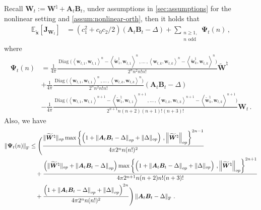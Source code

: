 \begin{lemma}
\label{expec-grad}
    Recall $\bm W_t := \bm W^\natural + \bm A_t \bm B_t$, under assumptions in \cref{sec:assumptions} for the nonlinear setting and \cref{assum:nonlinear-orth}, then it holds that
    \begin{align*}
    \mathbb{E}_{\widetilde{\bm x}}\left[\bm J_{\bm W_t}\right] & = \left(c_1^2+c_0 c_2 / 2\right)\left(\bm A_t \bm B_t - \Delta\right)+\sum_{\substack{n\geq 1,\\n\text{ odd}}}\bm \Psi_t(n)\,,
\end{align*}
where
\begin{align*}
    \bm \Psi_t(n) & = \frac{1}{4\pi} \frac{\operatorname{Diag}\bigg(\left\langle{\bm w}_{t,1},{\bm w}_{t,1}\right\rangle^{n}-\left\langle\widetilde{\bm w}^\natural_1,{\bm w}_{t,1}\right\rangle^{n}\,,...\,,\left\langle{\bm w}_{t,k},{\bm w}_{t,k}\right\rangle^{n}-\left\langle\widetilde{\bm w}^\natural_k,{\bm w}_{t,k}\right\rangle^{n}\bigg)}{2^{n} n^2 n! n!}  \widetilde{\bm W}^\natural\\
    &+\frac{1}{4\pi} \frac{\operatorname{Diag}\bigg(\left\langle{\bm w}_{t,1},{\bm w}_{t,1}\right\rangle^n\,,...\,,\left\langle{\bm w}_{t,k},{\bm w}_{t,k}\right\rangle^n\bigg)}{2^{n} n^2 n! n!}\left(\bm A_t \bm B_t - \Delta\right)\\
    &-\frac{1}{4\pi}\frac{\operatorname{Diag}\bigg(\left\langle{\bm w}_{t,1},{\bm w}_{t,1}\right\rangle^{n+1}-\left\langle\widetilde{\bm w}^\natural_1,{\bm w}_{t,1}\right\rangle^{n+1}\,,...\,,\left\langle{\bm w}_{t,k},{\bm w}_{t,k}\right\rangle^{n+1}-\left\langle\widetilde{\bm w}^\natural_k,{\bm w}_{t,k}\right\rangle^{n+1}\bigg)}{2^{n+1} n(n + 2)(n+1)!(n+3)!}{\bm W}_{t}\,.
\end{align*}
Also, we have
\begin{align*}
  \left\|\bm \Psi_t(n)\right\|_{\rm F}
  & \leq \Bigg(\frac{\|\widetilde{\bm W}^\natural\|_{op}\max\left\{\left(1 + \left\|\bm A_t \bm B_t - \Delta\right\|_{op} + \|\Delta\|_{op}\right)\,,\left\|\widetilde{\bm W}^\natural\right\|_{op}\right\}^{2n-1}}{4\pi 2^{n} n (n!)^2}\\
  & \quad +\frac{\left(\|\widetilde{\bm W}^\natural\|_{op}+\left\|\bm A_{t}\bm B_t - \Delta\right\|_{op}\right)\max\left\{\left(1 + \left\|\bm A_t \bm B_t - \Delta\right\|_{op} + \|\Delta\|_{op}\right)\,,\left\|\widetilde{\bm W}^\natural\right\|_{op}\right\}^{2n+1}}{4\pi2^{n+1} n(n + 2)n!(n+3)!}\\
  & \quad +\frac{\left(1+\left\|\bm A_{t}\bm B_t - \Delta\right\|_{op}+\left\|\Delta\right\|_{op}\right)^{2n}}{4\pi 2^{n} n (n!)^2}\Bigg)\left\|\bm A_t \bm B_t - \Delta\right\|_{\rm F}\,.
\end{align*}
\end{lemma}

